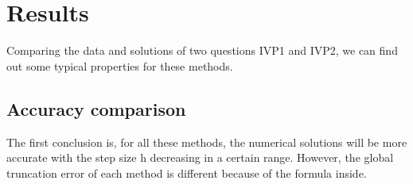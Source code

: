 \documentclass[a4paper]{article}
\begin{document}
    
	\section{Results}
	Comparing the data and solutions of two questions IVP1 and IVP2, we can find out some typical properties for these methods.
	
	
	\subsection{Accuracy comparison}
	
   The first conclusion is, for all these methods, the numerical solutions will be more accurate with the step size h decreasing in a certain range. 
   However, the global truncation error of each method is different because of the formula inside. 
   
\end{document}
